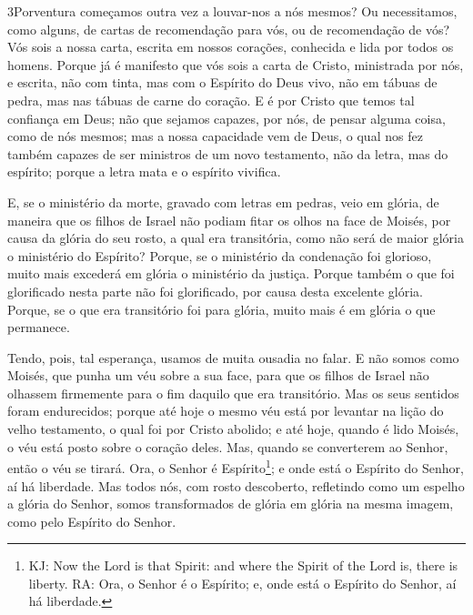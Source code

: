 \medskip

\lettrine{3} Porventura começamos outra vez a louvar-nos a nós
mesmos? Ou necessitamos, como alguns, de cartas de recomendação para
vós, ou de recomendação de vós? Vós sois a nossa carta, escrita
em nossos corações, conhecida e lida por todos os homens. Porque
já é manifesto que vós sois a carta de Cristo, ministrada por nós, e
escrita, não com tinta, mas com o Espírito do Deus vivo, não em
tábuas de pedra, mas nas tábuas de carne do coração. E é por
Cristo que temos tal confiança em Deus; não que sejamos capazes,
por nós, de pensar alguma coisa, como de nós mesmos; mas a nossa
capacidade vem de Deus, o qual nos fez também capazes de ser
ministros de um novo testamento, não da letra, mas do espírito;
porque a letra mata e o espírito vivifica.

E, se o ministério da morte, gravado com letras em pedras, veio em
glória, de maneira que os filhos de Israel não podiam fitar os olhos
na face de Moisés, por causa da glória do seu rosto, a qual era
transitória, como não será de maior glória o ministério do
Espírito? Porque, se o ministério da condenação foi glorioso,
muito mais excederá em glória o ministério da justiça. Porque
também o que foi glorificado nesta parte não foi glorificado, por
causa desta excelente glória. Porque, se o que era
transitório foi para glória, muito mais é em glória o que permanece.

Tendo, pois, tal esperança, usamos de muita ousadia no falar.
E não somos como Moisés, que punha um véu sobre a sua face,
para que os filhos de Israel não olhassem firmemente para o fim
daquilo que era transitório. Mas os seus sentidos foram
endurecidos; porque até hoje o mesmo véu está por levantar na lição
do velho testamento, o qual foi por Cristo abolido; e até
hoje, quando é lido Moisés, o véu está posto sobre o coração deles.
Mas, quando se converterem ao Senhor, então o véu se tirará.
Ora, o Senhor é Espírito\footnote{KJ: Now the Lord is that
Spirit: and where the Spirit of the Lord is, there is liberty. RA:
 Ora, o Senhor é o Espírito; e, onde está o Espírito do Senhor, aí há
liberdade.}; e onde está o Espírito do Senhor, aí há liberdade.
Mas todos nós, com rosto descoberto, refletindo como um
espelho a glória do Senhor, somos transformados de glória em glória
na mesma imagem, como pelo Espírito do Senhor.

\medskip

